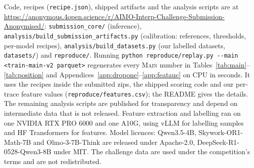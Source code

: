 \documentclass{article}
\providecommand{\codeurl}{\url{https://anonymous.4open.science/r/AIMO-Interp-Challenge-Submission-Anonymised/}}
\begin{document}
Code, recipes (\texttt{recipe.json}), shipped artifacts and the analysis scripts are at \codeurl: \texttt{submission\_core/} (inference), \texttt{analysis/build\_submission\_artifacts.py} (calibration: references, thresholds, per-model recipes), \texttt{analysis/build\_datasets.py} (our labelled datasets, \texttt{datasets/}) and \texttt{reproduce/}. Running \texttt{python reproduce/replay.py -{}-main <train-main-v2 parquet>} regenerates every \textsc{Main} number in Tables~\ref{tab:main}--\ref{tab:position} and Appendices~\ref{app:dropone}--\ref{app:featauc} on CPU in seconds. It uses the recipes inside the submitted zips, the shipped scoring code and our per-trace feature values (\texttt{reproduce/features.csv}); the README gives the details. The remaining analysis scripts are published for transparency and depend on intermediate data that is not released.
Feature extraction and labelling ran on one NVIDIA RTX PRO 6000 and one A10G, using vLLM \citep{kwon2023vllm} for labelling samples and HF Transformers for features.
Model licences: Qwen3.5-4B, Skywork-OR1-Math-7B and Olmo-3-7B-Think are released under Apache-2.0, DeepSeek-R1-0528-Qwen3-8B under MIT. The challenge data are used under the competition's terms and are not redistributed.

\clearpage

\end{document}
